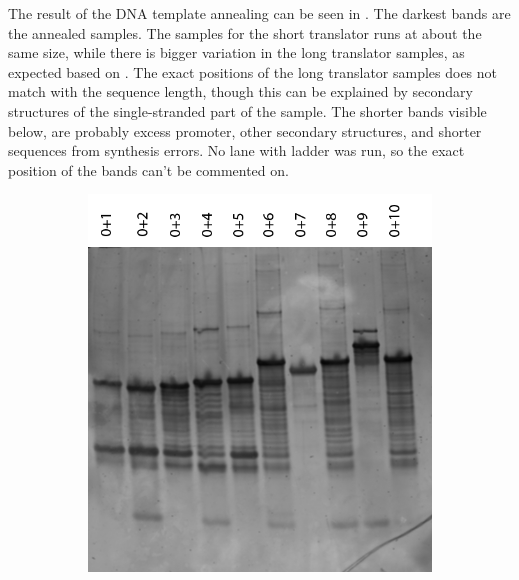 The result of the DNA template annealing can be seen in . The darkest bands are the annealed samples. The samples for the short translator runs at about the same size, while there is bigger variation in the long translator samples, as expected based on . The exact positions of the long translator samples does not match with the sequence length, though this can be explained by secondary structures of the single-stranded part of the sample. The shorter bands visible below, are probably excess promoter, other secondary structures, and shorter sequences from synthesis errors. No lane with ladder was run, so the exact position of the bands can't be commented on.


\begin{figure}[h]
\begin{subfigure}[t]{0.54\textwidth}
\includegraphics[width=\textwidth]{images/promoter_annealing_gel.png}
\caption{}
\label{promoter_annealing_gel}
\end{subfigure}
\begin{subfigure}[t]{0.46\textwidth}

\end{subfigure}
\end{figure}
